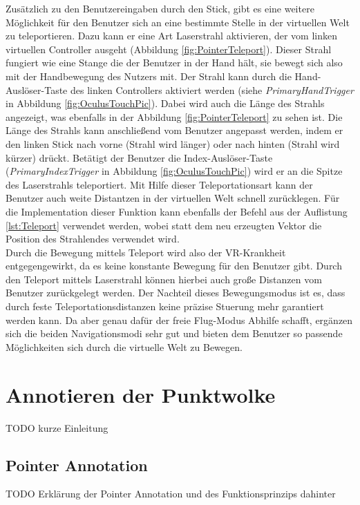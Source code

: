 Zusätzlich zu den Benutzereingaben durch den Stick, gibt es eine weitere Möglichkeit für den Benutzer sich an eine bestimmte Stelle in der virtuellen Welt zu teleportieren. Dazu kann er eine Art Laserstrahl aktivieren, der vom linken virtuellen Controller ausgeht (Abbildung \ref{fig:PointerTeleport}). Dieser Strahl fungiert wie eine Stange die der Benutzer in der Hand hält, sie bewegt sich also mit der Handbewegung des Nutzers mit. Der Strahl kann durch die Hand-Auslöser-Taste des linken Controllers aktiviert werden (siehe \textit{PrimaryHandTrigger} in Abbildung \ref{fig:OculusTouchPic}). Dabei wird auch die Länge des Strahls angezeigt, was ebenfalls in der Abbildung \ref{fig:PointerTeleport} zu sehen ist. Die Länge des Strahls kann anschließend vom Benutzer angepasst werden, indem er den linken Stick nach vorne (Strahl wird länger) oder nach hinten (Strahl wird kürzer) drückt. Betätigt der Benutzer die Index-Auslöser-Taste (\textit{PrimaryIndexTrigger} in Abbildung \ref{fig:OculusTouchPic}) wird er an die Spitze des Laserstrahls teleportiert. Mit Hilfe dieser Teleportationsart kann der Benutzer auch weite Distantzen in der virtuellen Welt schnell zurücklegen. Für die Implementation dieser Funktion kann ebenfalls der Befehl aus der Auflistung \ref{lst:Teleport} verwendet werden, wobei statt dem neu erzeugten Vektor die Position des Strahlendes verwendet wird.\\

Durch die Bewegung mittels Teleport wird also der VR-Krankheit entgegengewirkt, da es keine konstante Bewegung für den Benutzer gibt. Durch den Teleport mittels Laserstrahl können hierbei auch große Distanzen vom Benutzer zurückgelegt werden. Der Nachteil dieses Bewegungsmodus ist es, dass durch feste Teleportationsdistanzen keine präzise Stuerung mehr garantiert werden kann. Da aber genau dafür der freie Flug-Modus Abhilfe schafft, ergänzen sich die beiden Navigationsmodi sehr gut und bieten dem Benutzer so passende Möglichkeiten sich durch die virtuelle Welt zu Bewegen.
 

\section{Annotieren der Punktwolke}
\label{sec:Annotation}
TODO kurze Einleitung

\subsection{Pointer Annotation}
\label{sec:SimplePointerAnnotation}
TODO Erklärung der Pointer Annotation und des Funktionsprinzips dahinter

